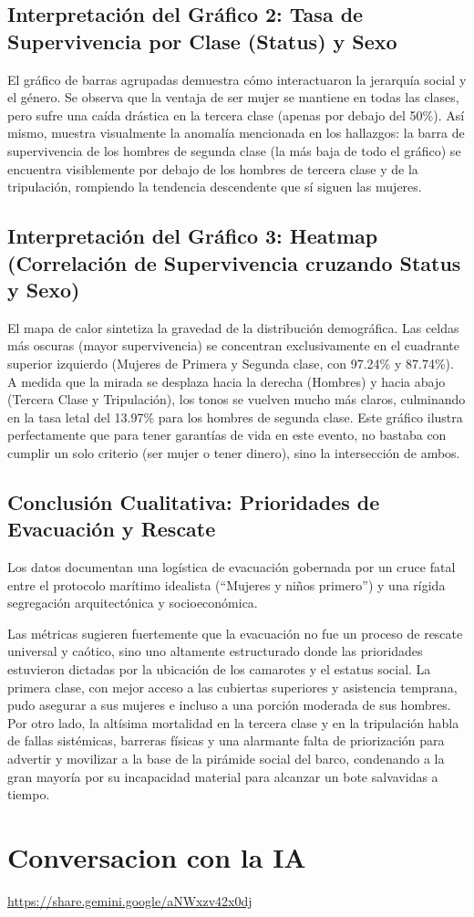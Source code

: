 \documentclass[letterpaper,11pt]{article}
\begin{document}
\subsection*{Interpretación del Gráfico 2: Tasa de Supervivencia por Clase (Status) y Sexo}
El gráfico de barras agrupadas demuestra cómo interactuaron la jerarquía social y el género. Se observa que la ventaja de ser mujer se mantiene en todas las clases, pero sufre una caída drástica en la tercera clase (apenas por debajo del 50\%). Así mismo, muestra visualmente la anomalía mencionada en los hallazgos: la barra de supervivencia de los hombres de segunda clase (la más baja de todo el gráfico) se encuentra visiblemente por debajo de los hombres de tercera clase y de la tripulación, rompiendo la tendencia descendente que sí siguen las mujeres.

\subsection*{Interpretación del Gráfico 3: Heatmap (Correlación de Supervivencia cruzando Status y Sexo)}
El mapa de calor sintetiza la gravedad de la distribución demográfica. Las celdas más oscuras (mayor supervivencia) se concentran exclusivamente en el cuadrante superior izquierdo (Mujeres de Primera y Segunda clase, con 97.24\% y 87.74\%). A medida que la mirada se desplaza hacia la derecha (Hombres) y hacia abajo (Tercera Clase y Tripulación), los tonos se vuelven mucho más claros, culminando en la tasa letal del 13.97\% para los hombres de segunda clase. Este gráfico ilustra perfectamente que para tener garantías de vida en este evento, no bastaba con cumplir un solo criterio (ser mujer o tener dinero), sino la intersección de ambos.

\subsection{Conclusión Cualitativa: Prioridades de Evacuación y Rescate}
Los datos documentan una logística de evacuación gobernada por un cruce fatal entre el protocolo marítimo idealista (``Mujeres y niños primero'') y una rígida segregación arquitectónica y socioeconómica.

Las métricas sugieren fuertemente que la evacuación no fue un proceso de rescate universal y caótico, sino uno altamente estructurado donde las prioridades estuvieron dictadas por la ubicación de los camarotes y el estatus social. La primera clase, con mejor acceso a las cubiertas superiores y asistencia temprana, pudo asegurar a sus mujeres e incluso a una porción moderada de sus hombres. Por otro lado, la altísima mortalidad en la tercera clase y en la tripulación habla de fallas sistémicas, barreras físicas y una alarmante falta de priorización para advertir y movilizar a la base de la pirámide social del barco, condenando a la gran mayoría por su incapacidad material para alcanzar un bote salvavidas a tiempo.

\section{Conversacion con la IA}
\url{https://share.gemini.google/aNWxzv42x0dj}



\nocite{*}
\printbibliography[heading=bibintoc, title={Referencias}]
\end{document}

